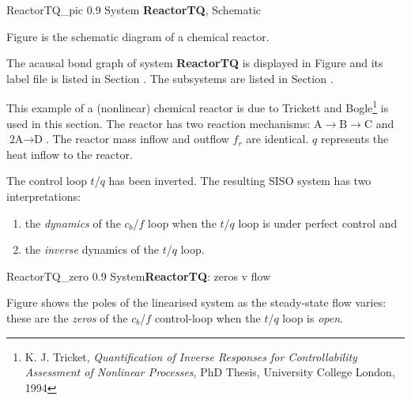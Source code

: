 

{ReactorTQ_pic} {0.9} {System \textbf{ReactorTQ}, Schematic}

Figure  is the schematic diagram of a chemical
reactor.

The acausal bond graph of system \textbf{ReactorTQ} is displayed in
Figure  and its label file is listed in
Section .  The subsystems are listed in Section
.

This example of a (nonlinear) chemical reactor is due to Trickett and
Bogle\footnote{ K. J. Tricket, \emph{Quantification of Inverse
    Responses for Controllability Assessment of Nonlinear Processes},
  PhD Thesis, University College London, 1994} is used in this
section.  The reactor has two reaction mechanisms: $\text{A}
\rightarrow \text{B} \rightarrow \text{C}$ and $\text{2A} \rightarrow
\text{D}$.  The reactor mass inflow and outflow $f_r$ are identical.
$q$ represents the heat inflow to the reactor.

The control loop $t$/$q$ has been inverted. The resulting SISO
system has two interpretations:
\begin{enumerate}
\item the \emph{dynamics} of the $c_b$/$f$ loop when the $t$/$q$ loop
  is under perfect control and
\item the \emph{inverse} dynamics of the  $t$/$q$ loop.
\end{enumerate}

 {ReactorTQ_zero} {0.9}
{System\textbf{ReactorTQ}: zeros v flow} 

Figure 
shows the poles of the linearised system as the steady-state flow
varies: these are the \emph{zeros} of the $c_b$/$f$ control-loop when
the $t$/$q$ loop is \emph{open}.


